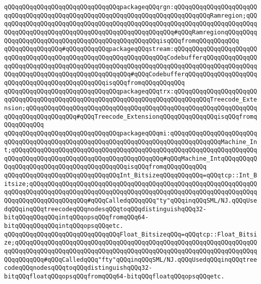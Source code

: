 \verb|qQQqqQQqqQQqqQQqqQQqqQQqqQQqqQQqpackageqQQqrgn:qQQqqQQqqQQqqQQqqQQqqQQqqQQqqQQqqQQqqQQqqQQqqQQqqQQqqQQqqQQqqQQqqQQqqQQqqQQqqQQqRamregion;qQQqqQQqqQQqqQQqqQQqqQQqqQQqqQQqqQQqqQQqqQQqqQQqqQQqqQQqqQQqqQQqqQQqqQQqqQQqqQQqqQQqqQQqqQQqqQQqqQQqqQQqqQQqqQQqqQQqqQQq#qQQqRamregionqQQqqQQqqQQqqQQqqQQqqQQqqQQqqQQqqQQqqQQqqQQqqQQqqQQqisqQQqfromqQQqqQQqqQQq|\newline
\verb|qQQqqQQqqQQqqQQq#qQQqqQQqqQQqpackageqQQqstream:qQQqqQQqqQQqqQQqqQQqqQQqqQQqqQQqqQQqqQQqqQQqqQQqqQQqqQQqqQQqqQQqqQQqCodebufferqQQqqQQqqQQqqQQqqQQqqQQqqQQqqQQqqQQqqQQqqQQqqQQqqQQqqQQqqQQqqQQqqQQqqQQqqQQqqQQqqQQqqQQqqQQqqQQqqQQqqQQqqQQqqQQqqQQqqQQq#qQQqCodebufferqQQqqQQqqQQqqQQqqQQqqQQqqQQqqQQqqQQqqQQqqQQqqQQqisqQQqfromqQQqqQQqqQQq|\newline
\verb|qQQqqQQqqQQqqQQqqQQqqQQqqQQqqQQqpackageqQQqtrx:qQQqqQQqqQQqqQQqqQQqqQQqqQQqqQQqqQQqqQQqqQQqqQQqqQQqqQQqqQQqqQQqqQQqqQQqqQQqqQQqTreecode_Extension;qQQqqQQqqQQqqQQqqQQqqQQqqQQqqQQqqQQqqQQqqQQqqQQqqQQqqQQqqQQqqQQqqQQqqQQqqQQqqQQqqQQq#qQQqTreecode_ExtensionqQQqqQQqqQQqqQQqisqQQqfromqQQqqQQqqQQq|\newline
\verb|qQQqqQQqqQQqqQQqqQQqqQQqqQQqqQQqpackageqQQqmi:qQQqqQQqqQQqqQQqqQQqqQQqqQQqqQQqqQQqqQQqqQQqqQQqqQQqqQQqqQQqqQQqqQQqqQQqqQQqqQQqqQQqMachine_Int;qQQqqQQqqQQqqQQqqQQqqQQqqQQqqQQqqQQqqQQqqQQqqQQqqQQqqQQqqQQqqQQqqQQqqQQqqQQqqQQqqQQqqQQqqQQqqQQqqQQqqQQqqQQqqQQq#qQQqMachine_IntqQQqqQQqqQQqqQQqqQQqqQQqqQQqqQQqqQQqqQQqqQQqisqQQqfromqQQqqQQqqQQq|\newline
\newline
\verb|qQQqqQQqqQQqqQQqqQQqqQQqqQQqqQQqInt_BitsizeqQQqqQQqqQQq=qQQqtcp::Int_Bitsize;qQQqqQQqqQQqqQQqqQQqqQQqqQQqqQQqqQQqqQQqqQQqqQQqqQQqqQQqqQQqqQQqqQQqqQQqqQQqqQQqqQQqqQQqqQQqqQQqqQQqqQQqqQQqqQQqqQQqqQQqqQQqqQQqqQQqqQQqqQQqqQQqqQQqqQQqqQQq#qQQqCalledqQQqqQQq"ty"qQQqinqQQqSML/NJ.qQQqUsedqQQqinqQQqtreecodeqQQqnodesqQQqtoqQQqdistinguishqQQq32-bitqQQqqQQqqQQqintqQQqopsqQQqfromqQQq64-bitqQQqqQQqqQQqintqQQqopsqQQqetc.|\newline
\verb|qQQqqQQqqQQqqQQqqQQqqQQqqQQqqQQqFloat_BitsizeqQQq=qQQqtcp::Float_Bitsize;qQQqqQQqqQQqqQQqqQQqqQQqqQQqqQQqqQQqqQQqqQQqqQQqqQQqqQQqqQQqqQQqqQQqqQQqqQQqqQQqqQQqqQQqqQQqqQQqqQQqqQQqqQQqqQQqqQQqqQQqqQQqqQQqqQQqqQQqqQQqqQQqqQQq#qQQqCalledqQQq"fty"qQQqinqQQqSML/NJ.qQQqUsedqQQqinqQQqtreecodeqQQqnodesqQQqtoqQQqdistinguishqQQq32-bitqQQqfloatqQQqopsqQQqfromqQQq64-bitqQQqfloatqQQqopsqQQqetc.|\newline
